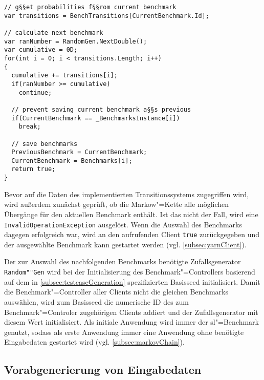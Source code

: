 \begin{lstlisting}[label=lst:benchmarkChanging,style=cs,
caption={[Auswahl des nachfolgenden Benchmarks]
    Auswahl des nachfolgenden Benchmarks (gekürzt).
    Dies stellt einen Ausschnitt der Methode \texttt{ChangeBenchmark()} dar, welche vom Client zur Bestimmung des nachfolgenden Benchmarks aufgerufen wird (vgl. \cref{subsec:yarnClient}).}]
// g§§et probabilities f§§rom current benchmark
var transitions = BenchTransitions[CurrentBenchmark.Id];

// calculate next benchmark
var ranNumber = RandomGen.NextDouble();
var cumulative = 0D;
for(int i = 0; i < transitions.Length; i++)
{
  cumulative += transitions[i];
  if(ranNumber >= cumulative)
    continue;
  
  // prevent saving current benchmark a§§s previous
  if(CurrentBenchmark == _BenchmarksInstance[i])
    break;
  
  // save benchmarks
  PreviousBenchmark = CurrentBenchmark;
  CurrentBenchmark = Benchmarks[i];
  return true;
}
\end{lstlisting}

Bevor auf die Daten des implementierten Transitionssystems zugegriffen wird, wird außerdem zunächst geprüft, ob die Markow"=Kette alle möglichen Übergänge für den aktuellen Benchmark enthält.
Ist das nicht der Fall, wird eine \texttt{InvalidOperationException} ausgelöst.
Wenn die Auswahl des Benchmarks dagegen erfolgreich war, wird an den aufrufenden Client \texttt{true} zurückgegeben und der ausgewählte Benchmark kann gestartet werden (vgl. \cref{subsec:yarnClient}).

Der zur Auswahl des nachfolgenden Benchmarks benötigte Zufallsgenerator \texttt{Random""Gen} wird bei der Initialisierung des Benchmark"=Controllers basierend auf dem in \cref{subsec:testcaseGeneration} spezifizierten Basisseed initialisiert.
Damit die Benchmark"=Controller aller Clients nicht die gleichen Benchmarks auswählen, wird zum Basisseed die numerische ID des zum Benchmark"=Controler zugehörigen Clients addiert und der Zufallsgenerator mit diesem Wert initialisiert.
Als initiale \gls{Anwendung} wird immer der \acrlong{sl}"=Benchmark genutzt, sodass als erste \gls{Anwendung} immer eine \gls{Anwendung} ohne benötigte Eingabedaten gestartet wird (vgl. \cref{subsec:markovChain}).

\subsection{Vorabgenerierung von Eingabedaten}
\label{subsec:precreateInputData}

